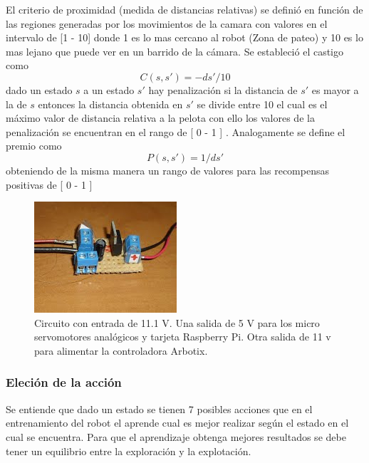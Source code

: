 El criterio de proximidad (medida de distancias relativas) se definió en función de las regiones generadas por los movimientos de la camara con valores en el intervalo de [1 - 10] donde 1 es lo mas cercano al robot (Zona de pateo) y 10 es lo mas lejano que puede ver en un barrido de la c\'amara. Se estableci\'o el castigo como \[C(s,s') = -ds'/ 10 \] dado un estado  $ s$ a un estado $s'$ hay penalización si la distancia de $s'$ es mayor a la de $s$ entonces la distancia obtenida en $s'$ se divide entre 10 el cual es el máximo valor de distancia relativa a la pelota con ello los valores de la penalización se encuentran en el rango de [ 0 - 1 ] . Analogamente se define el premio como \[P(s,s') = 1 /ds' \] obteniendo de la misma manera un rango de valores para las recompensas positivas de [ 0 - 1 ] 
\begin{figure}[hbtp]
\centering
\includegraphics[scale=0.5]{imagenes/circuito.jpg}
\caption{Circuito con entrada de 11.1 V. Una salida de 5 V para los micro servomotores anal\'ogicos y tarjeta Raspberry Pi. Otra salida de 11 v para alimentar la controladora Arbotix.}
\label{fig:circuito}
\end{figure}


\subsubsection{Eleci\'on de la acci\'on}


Se entiende que dado un estado se tienen 7 posibles acciones que en el entrenamiento del robot el aprende cual es mejor realizar según el estado en el cual se encuentra. Para que el aprendizaje obtenga mejores resultados se debe tener un equilibrio entre la exploración y la explotación. 

 
 
 
 
 
